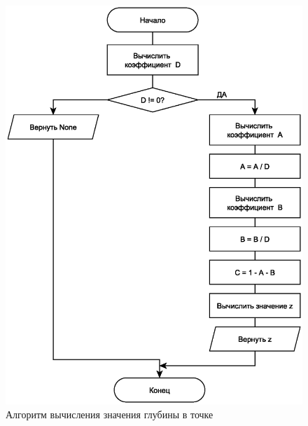 \begin{figure}[H]
	\centering
	\includegraphics[scale=0.7]{img/bary.eps}
	\caption{Алгоритм вычисления значения глубины в точке}
	\label{fig:barry}
\end{figure}

